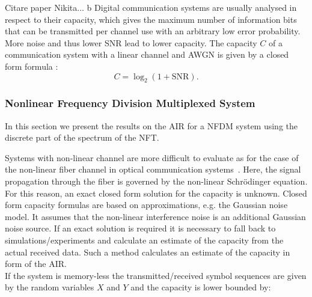 Citare paper Nikita...
b
Digital communication systems are usually analysed in respect to their capacity, which gives the maximum number of information bits that can be transmitted per channel use with an arbitrary low error probability. More noise and thus lower \ac{SNR} lead to lower capacity. The capacity $C$ of a communication system with a linear channel and \ac{AWGN}  is given by a closed form formula \cite{shannon2001mathematical}:
\begin{equation}
\label{eq:capacity}
	C = \log_2\left( 1+\text{SNR} \right).
\end{equation}

\subsubsection{Nonlinear Frequency Division Multiplexed System}
In this section we present the results on the AIR for a \ac{NFDM} system using the discrete part of the spectrum of the \ac{NFT}.


\noindent Systems with non-linear channel are more difficult to evaluate as for the case of the non-linear fiber channel in optical communication systems~\cite{essiambre2010capacity}. Here, the signal propagation through the fiber is governed by the non-linear Schr\"{o}dinger equation. For this reason, an exact closed form solution for the capacity is unknown.
Closed form capacity formulas are based on approximations, e.g. the Gaussian noise model. It assumes that the non-linear interference noise is an additional Gaussian noise source. If an exact solution is required it is necessary to fall back to simulations/experiments and calculate an estimate of the capacity from the actual received data. Such a method calculates an estimate of the capacity in form of the \ac{AIR}.\\
If the system is memory-less the transmitted/received symbol sequences are given by the random variables $X$ and $Y$ and the capacity is lower bounded by:

